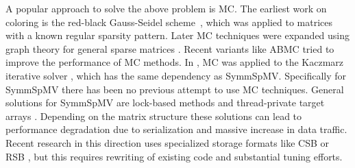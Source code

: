 A popular approach to solve the above problem is \acrfull{MC}.
The earliest work on coloring is the red-black 
Gauss-Seidel scheme~\cite{RBGS}, which was applied to  matrices with a
 known regular sparsity pattern. 
Later \acrlong{MC} techniques were expanded using graph theory
for general sparse matrices \cite{MC,COLPACK}.
Recent variants like \acrfull{ABMC} \cite{ABMC} tried to improve the performance 
of \acrshort{MC} methods. 
In \cite{feast_mc}, \acrshort{MC} was applied to the Kaczmarz iterative solver \cite{kaczmarz},
 which has the same \DTWO dependency as \acrshort{SymmSpMV}.
Specifically for \acrshort{SymmSpMV} there has been no previous attempt to use 
\acrlong{MC} techniques. General solutions for \acrshort{SymmSpMV} are 
lock-based methods and thread-private target arrays \cite{sparseX,thread_private_symm_spmv}.
Depending on the matrix structure these solutions can lead to performance
 degradation  due to serialization and massive increase in data traffic.
Recent research in this direction uses specialized storage formats like
 CSB \cite{CSB} or RSB \cite{RSB}, but this requires rewriting of existing 
 code and substantial tuning efforts. 

 

